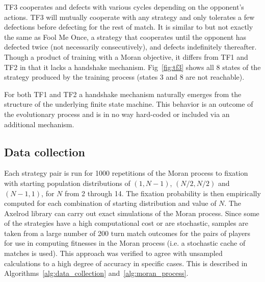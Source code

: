 \documentclass[10pt,letterpaper]{article}
\begin{document}
TF3 cooperates and defects with
various cycles depending on the opponent's actions. TF3 will mutually
cooperate with any strategy and only tolerates a few defections before
defecting for the rest of match. It is similar to but not exactly the same as
Fool Me Once, a strategy that cooperates until the opponent has defected twice
(not necessarily consecutively), and defects indefinitely thereafter. Though a
product of training with a Moran objective, it differs from TF1 and TF2
in that it lacks a handshake mechanism. Fig~\ref{fig:tf3} shows
all 8 states of the strategy produced by the training process (states 3 and 8
are not reachable).

For both TF1 and TF2 a handshake
mechanism naturally emerges from the structure of the underlying finite state
machine. This behavior is an outcome of the evolutionary process and is in no
way hard-coded or included via an additional mechanism.

\begin{table}[!hbtp]
    \centering
        \caption{Memory depths}
        \label{tbl:memory_depth_count}
\end{table}

\subsection*{Data collection}

Each strategy pair is run for 1000 repetitions of the Moran process to fixation
with starting population distributions of $(1, N-1)$, $(N/2, N/2)$ and $(N-1 ,
1)$, for \(N\) from 2 through 14. The fixation probability is then empirically
computed for each combination of starting distribution and value of \(N\). The
Axelrod library can carry out exact simulations of the Moran process. Since some
of the strategies have a high computational cost or are stochastic, samples are
taken from a large number of 200 turn match outcomes for the pairs of players
for use in computing fitnesses in the Moran process (i.e. a stochastic cache of
matches is used). This approach was verified to agree with unsampled
calculations to a high degree of accuracy in specific cases. This is described
in Algorithms~\ref{alg:data_collection} and~\ref{alg:moran_process}.
\end{document}
